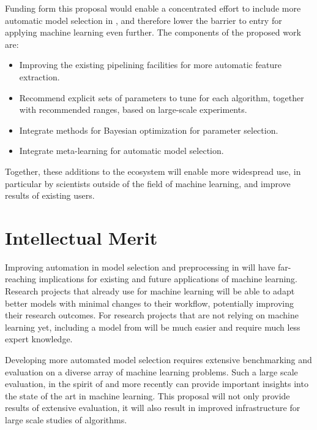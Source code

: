 Funding form this proposal would enable a concentrated effort to include more
automatic model selection in \sklearn{}, and therefore lower the barrier to
entry for applying machine learning even further.
The components of the proposed work are:
\begin{itemize}
    \item Improving the existing pipelining facilities for more automatic feature extraction.
    \item Recommend explicit sets of parameters to tune for each algorithm,
        together with recommended ranges, based on large-scale experiments.
    \item Integrate methods for Bayesian optimization for parameter selection.
    \item Integrate meta-learning for automatic model selection.
\end{itemize}
Together, these additions to the \sklearn{} ecosystem will enable more widespread use,
in particular by scientists outside of the field of machine learning, and improve results
of existing users.

\section{Intellectual Merit}
Improving automation in model selection and preprocessing in \sklearn{} will have far-reaching
implications for existing and future applications of machine learning.
Research projects that already use \sklearn{} for machine learning will be able to adapt better
models with minimal changes to their workflow, potentially improving their research outcomes.
For research projects that are not relying on machine learning yet, including a model
from \sklearn{} will be much easier and require much less expert knowledge.

Developing more automated model selection requires extensive benchmarking and evaluation
on a diverse array of machine learning problems. Such a large scale evaluation,
in the spirit of \textcite{caruana2008empirical, caruana2006empirical} and more
recently \textcite{feurer-nips2015} can provide important insights into the state
of the art in machine learning. This proposal will not only provide results of
extensive evaluation, it will also result in improved infrastructure
for large scale studies of algorithms.

